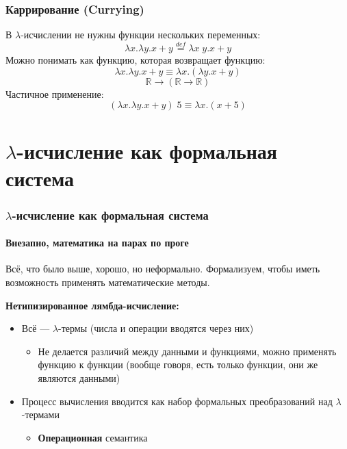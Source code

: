 \documentclass[xetex,mathserif,serif]{beamer}
\begin{document}
    \begin{frame}
        \frametitle{Каррирование (Currying)}
        В $\lambda$-исчислении не нужны функции нескольких переменных:
        $$\lambda x.\lambda y.x + y \stackrel{def}{=} \lambda x \; y.x + y$$
        Можно понимать как функцию, которая возвращает функцию:
        $$\lambda x.\lambda y.x + y \equiv \lambda x.(\lambda y.x + y)$$
        $$\mathbb{R} \rightarrow (\mathbb{R} \rightarrow \mathbb{R})$$
        Частичное применение:
        $$(\lambda x.\lambda y.x + y) \; 5 \equiv \lambda x.(x + 5)$$
    \end{frame}
    
    \section{$\lambda$-исчисление как формальная система}
        
    \begin{frame}
        \frametitle{$\lambda$-исчисление как формальная система}
        \framesubtitle{Внезапно, математика на парах по проге}
        Всё, что было выше, хорошо, но неформально. Формализуем, чтобы иметь возможность
        применять математические методы.
        
        \textbf{Нетипизированное лямбда-исчисление:}
        \begin{itemize}
            \item Всё --- $\lambda$-термы (числа и операции вводятся через них)
            \begin{itemize}
                \item Не делается различий между данными и функциями, можно применять 
                        функцию к функции (вообще говоря, есть только функции, они же являются данными)
            \end{itemize}
            \item Процесс вычисления вводится как набор формальных преобразований над
                    $\lambda$-термами
            \begin{itemize}
                \item \textbf{Операционная} семантика
            \end{itemize}
        \end{itemize}
    \end{frame}
\end{document}
